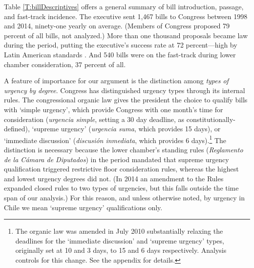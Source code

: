 \documentclass[letter,12pt]{article}
\begin{document}
Table \ref{T:billDescriptives} offers a general summary of bill introduction, passage, and fast-track incidence. The executive sent 1,467 bills to Congress between 1998 and 2014, ninety-one yearly on average. (Members of Congress proposed 79 percent of all bills, not analyzed.) More than one thousand proposals became law during the period, putting the executive's success rate at 72 percent---high by Latin American standards \citep{morgenstern.nacif.2002}. And 540 bills were on the fast-track during lower chamber consideration, 37 percent of all.


A feature of importance for our argument is the distinction among \emph{types of urgency by degree}. Congress has distinguished urgency types through its internal rules. The congressional organic law gives the president the choice to qualify bills with `simple urgency', which provide Congress with one month's time for consideration (\emph{urgencia simple}, setting a 30 day deadline, as constitutionally-defined), `supreme urgency' (\emph{urgencia suma}, which provides 15 days), or `immediate discussion' (\emph{discusión inmediata}, which provides 6 days).\footnote{\label{fnRelax}The organic law was amended in July 2010 substantially relaxing the deadlines for the `immediate discussion' and `supreme urgency' types, originally set at 10 and 3 days, to 15 and 6 days respectively. Analysis controls for this change. See the appendix for details.} The distinction is necessary because the lower chamber's standing rules (\emph{Reglamento de la Cámara de Diputados}) in the period mandated that supreme urgency qualification triggered restrictive floor consideration rules, whereas the highest and lowest urgency degrees did not. (In 2014 an amendment to the Rules expanded closed rules to two types of urgencies, but this falls outside the time span of our analysis.) For this reason, and unless otherwise noted, by urgency in Chile we mean `supreme urgency' qualifications only. 

\end{document}

